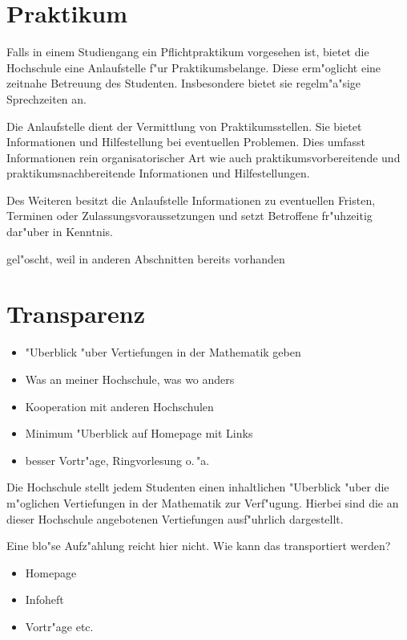 \section{Praktikum}

Falls in einem Studiengang ein Pflichtpraktikum vorgesehen ist, bietet die Hochschule eine Anlaufstelle f"ur Praktikumsbelange. Diese erm"oglicht eine zeitnahe Betreuung des Studenten. Insbesondere bietet sie regelm"a"sige Sprechzeiten an.

Die Anlaufstelle dient der Vermittlung von Praktikumsstellen. Sie bietet Informationen und Hilfestellung bei eventuellen Problemen. Dies umfasst Informationen rein organisatorischer Art wie auch praktikumsvorbereitende und praktikumsnachbereitende Informationen und Hilfestellungen.

Des Weiteren besitzt die Anlaufstelle Informationen zu eventuellen Fristen, Terminen oder Zulassungsvoraussetzungen und setzt Betroffene fr"uhzeitig dar"uber in Kenntnis.

\begin{kcmt}\begin{komacmt}
gel"oscht, weil in anderen Abschnitten bereits vorhanden

\section{Transparenz}
	\begin{itemize}
		\item "Uberblick "uber Vertiefungen in der Mathematik geben
		\item Was an meiner Hochschule, was wo anders
		\item Kooperation mit anderen Hochschulen
		\item Minimum "Uberblick auf Homepage mit Links
		\item besser Vortr"age, Ringvorlesung o.\,"a.
	\end{itemize}


Die Hochschule stellt jedem Studenten einen inhaltlichen "Uberblick "uber die m"oglichen
Vertiefungen in der Mathematik zur Verf"ugung. Hierbei sind die an dieser
Hochschule angebotenen Vertiefungen ausf"uhrlich dargestellt.

	Eine blo"se Aufz"ahlung reicht hier nicht.
	Wie kann das transportiert werden?
	\begin{itemize}
		\item Homepage
		\item Infoheft
		\item Vortr"age etc.
	\end{itemize}
\end{komacmt}\end{kcmt}

